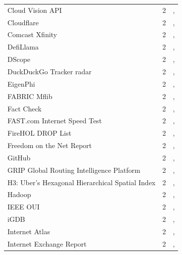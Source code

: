 \documentclass[11pt,a4paper]{article}
\begin{document}
\begin{longtable}{@{}p{} p{}p{}@{}}
Cloud Vision API  & 2 & \cite{10.1145/3517745.3561460}, \cite{10.1145/3487552.3487850} \\
Cloudflare & 2 & \cite{10.1145/3777912.3839811}, \cite{10.1145/3777912.3839791} \\
Comcast Xfinity  & 2 & \cite{10.1145/3487552.3487862}, \cite{10.1007/978-3-030-98785-5_4} \\
DefiLlama & 2 & \cite{10.1145/3777912.3839782}, \cite{10.1145/3777912.3809150} \\
DScope & 2 & \cite{10.1007/978-3-031-85960-1_4}, \cite{10.1145/3777912.3809148} \\
DuckDuckGo Tracker radar & 2 & \cite{10.1145/3618257.3624803}, \cite{10.1145/3777912.3839787} \\
EigenPhi & 2 & \cite{10.1145/3618257.3624824}, \cite{10.1145/3777912.3809150} \\
FABRIC Mflib  & 2 & \cite{10.1145/3730567.3764462}, \cite{10.1007/978-3-031-85960-1_10} \\
Fact Check & 2 & \cite{10.1145/3487552.3487850}, \cite{10.1145/3487552.3487859} \\
FAST.com Internet Speed Test  & 2 & \cite{10.1145/3730567.3764473}, \cite{10.1007/978-3-030-98785-5_4} \\
FireHOL DROP List  & 2 & \cite{10.1145/3517745.3561454}, \cite{10.1007/978-3-030-72582-2_4} \\
Freedom on the Net Report  & 2 & \cite{10.1145/3487552.3487822}, \cite{10.1007/978-3-030-98785-5_23} \\
GitHub  & 2 & \cite{10.1007/978-3-030-72582-2_5}, \cite{10.1007/978-3-030-98785-5_30} \\
GRIP Global Routing Intelligence Platform & 2 & \cite{10.1007/978-3-031-28486-1_15}, \cite{10.1007/978-3-032-18268-5_1} \\
H3: Uber’s Hexagonal Hierarchical Spatial Index  & 2 & \cite{10.1145/3646547.3688441}, \cite{10.1007/978-3-031-85960-1_20} \\
Hadoop & 2 & \cite{10.1145/3730567.3764459}, \cite{10.1007/978-3-032-18268-5_16} \\
IEEE OUI & 2 & \cite{10.1145/3487552.3487829}, \cite{10.1007/978-3-031-56249-5_5} \\
iGDB & 2 & \cite{10.1145/3646547.3688429}, \cite{10.1145/3777912.3809135} \\
Internet Atlas  & 2 & \cite{10.1145/3517745.3561443}, \cite{10.1007/978-3-030-72582-2_15} \\
Internet Exchange Report  & 2 & \cite{10.1145/3517745.3561443}, \cite{10.1007/978-3-030-98785-5_16} \\

\end{longtable}
\end{document}
